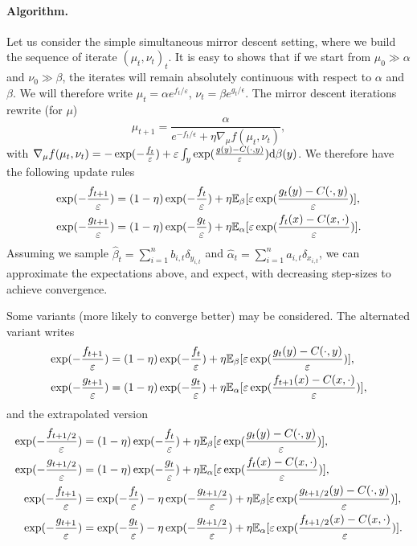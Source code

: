 \documentclass[a4paper, 10pt]{article}
\begin{document}
\paragraph{Algorithm.} Let us consider the simple simultaneous mirror descent setting, where we build
the sequence of iterate $(\mu_t, \nu_t)_t$. It is easy to shows that if we start
from $\mu_0 \gg \alpha$ and $\nu_0 \gg \beta$, the iterates will remain
absolutely continuous with respect to $\alpha$ and $\beta$. We will therefore
write $\mu_t = \alpha e^{f_t / \varepsilon}$, $\nu_t = \beta e^{g_t /
\epsilon}$. The mirror descent iterations rewrite (for $\mu$)
\begin{equation}
    \mu_{t+1} = \frac{\alpha}{e^{-f_t / \epsilon} + \eta \nabla_\mu f(\mu_t, \nu_t)},
\end{equation}
with $\nabla_\mu f(\mu_t, \nu_t) = - \exp(-\frac{f_t}{\varepsilon})+ \varepsilon
\int_y \exp(\frac{g(y)-C(\cdot, y)}{\varepsilon})\textrm{d}\beta(y)$. We therefore have the
following update rules
\begin{align}
    \exp(-\frac{f_{t+1}}{\varepsilon}) &=
     (1 - \eta) \exp(-\frac{f_{t}}{\varepsilon}) 
     + \eta \mathbb{E}_\beta[\varepsilon \exp( \frac{g_t(y)-C(\cdot, y)}{\varepsilon})], \\
     \exp(-\frac{g_{t+1}}{\varepsilon}) &=
     (1 - \eta) \exp(-\frac{g_{t}}{\varepsilon}) 
     + \eta \mathbb{E}_\alpha[\varepsilon \exp( \frac{f_t(x)-C(x, \cdot)}{\varepsilon})].
\end{align}
Assuming we sample $\hat \beta_t = \sum_{i=1}^n b_{i,t} \delta_{y_{i,t}}$ and
$\hat \alpha_t = \sum_{i=1}^n a_{i,t} \delta_{x_{i,t}}$, we can approximate the
expectations above, and expect, with decreasing step-sizes to achieve
convergence.

Some variants (more likely to converge better) may be considered. The alternated variant writes
\begin{align}
    \exp(-\frac{f_{t+1}}{\varepsilon}) &=
     (1 - \eta) \exp(-\frac{f_{t}}{\varepsilon}) 
     + \eta \mathbb{E}_\beta[\varepsilon \exp( \frac{g_t(y)-C(\cdot, y)}{\varepsilon})], \\
     \exp(-\frac{g_{t+1}}{\varepsilon}) &=
     (1 - \eta) \exp(-\frac{g_{t}}{\varepsilon}) 
     + \eta \mathbb{E}_\alpha[\varepsilon \exp( \frac{f_{t+1}(x)-C(x, \cdot)}{\varepsilon})],
\end{align}
and the extrapolated version
\begin{align}
    \exp(-\frac{f_{t+1/2}}{\varepsilon}) &=
     (1 - \eta) \exp(-\frac{f_{t}}{\varepsilon}) 
     + \eta \mathbb{E}_\beta[\varepsilon \exp( \frac{g_t(y)-C(\cdot, y)}{\varepsilon})], \\
     \exp(-\frac{g_{t+1/2}}{\varepsilon}) &=
     (1 - \eta) \exp(-\frac{g_{t}}{\varepsilon}) 
     + \eta \mathbb{E}_\alpha[\varepsilon \exp( \frac{f_t(x)-C(x, \cdot)}{\varepsilon})], \\
     \exp(-\frac{f_{t+1}}{\varepsilon}) &=
     \exp(-\frac{f_{t}}{\varepsilon}) - \eta \exp(-\frac{g_{t + 1 / 2}}{\varepsilon})
     + \eta \mathbb{E}_\beta[\varepsilon \exp( \frac{g_{t+1/2}(y)-C(\cdot, y)}{\varepsilon})], \\
     \exp(-\frac{g_{t+1}}{\varepsilon}) &=
     \exp(-\frac{g_{t}}{\varepsilon}) - \eta \exp(-\frac{g_{t + 1 / 2}}{\varepsilon})
     + \eta \mathbb{E}_\alpha[\varepsilon \exp( \frac{f_{t+1/2}(x)-C(x, \cdot)}{\varepsilon})].
\end{align}
\end{document}
